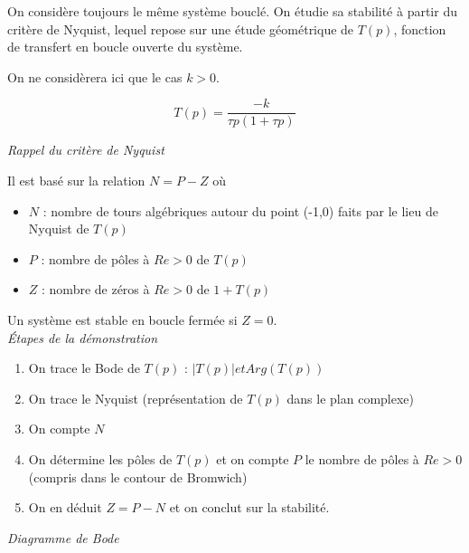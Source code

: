 \documentclass[../../Cours_M1.tex]{subfiles}
\begin{document}
On considère toujours le même système bouclé. On étudie sa stabilité à partir du critère de Nyquist, lequel repose sur une étude géométrique de $T(p)$, fonction de transfert en boucle ouverte du système.

On ne considèrera ici que le cas $k>0$.

\[T(p) = \frac{-k}{\tau p(1+\tau p)}\]

\textit{Rappel du critère de Nyquist}

Il est basé sur la relation $\boxed{N=P-Z}$ où 
\begin{itemize}
\item $N$ : nombre de tours algébriques autour du point (-1,0) faits par le lieu de Nyquist de $T(p)$
\item $P$ : nombre de pôles à $Re >0$ de $T(p)$
\item $Z$ : nombre de zéros à $Re >0$ de $1+T(p)$
\end{itemize}

Un système est stable en boucle fermée si $Z=0$.\\

\textit{Étapes de la démonstration}
\begin{enumerate}
\item On trace le Bode de $T(p)$ : $|T(p)| et Arg(T(p))$
\item On trace le Nyquist (représentation de $T(p)$ dans le plan complexe)
\item On compte $N$
\item On détermine les pôles de $T(p)$ et on compte $P$ le nombre de pôles à $Re>0$ (compris dans le contour de Bromwich)
\item On en déduit $Z=P-N$ et on conclut sur la stabilité. 
\end{enumerate}

\textit{Diagramme de Bode}\\
\begin{figure}[h!]
\centering
{}
\end{figure}
\end{document}
